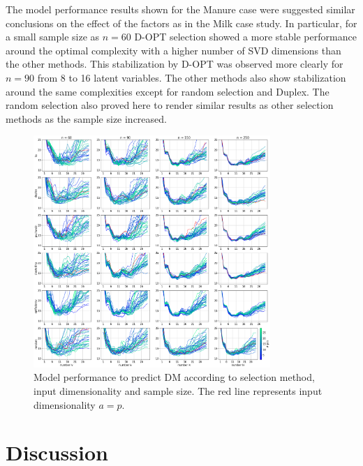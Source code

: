 \documentclass[journal=ancham,manuscript=article]{achemso}
\begin{document}
The model performance results shown for the Manure case were suggested similar conclusions on the effect of the factors as in the Milk case study. In particular, for a small sample size as $n=60$ D-OPT selection showed a more stable performance  around the optimal complexity with a higher number of SVD dimensions than the other methods. This stabilization by D-OPT was observed more clearly for $n=90$ from 8 to 16 latent variables. The other methods also show stabilization around the same complexities except for random selection and Duplex. The random selection also proved here to render similar results as other selection methods as the sample size increased.




\begin{figure}[b]
\includegraphics[width=0.8\textwidth]{manuscript/figures/d02_manure_model_performance.png}
\centering
\caption{Model performance to predict DM according to selection method, input dimensionality and sample size. The red line represents input dimensionality $a=p$.}
\label{fig_d02_manure_model_performance}
\end{figure}


\section*{Discussion}\label{discussion}
\end{document}
